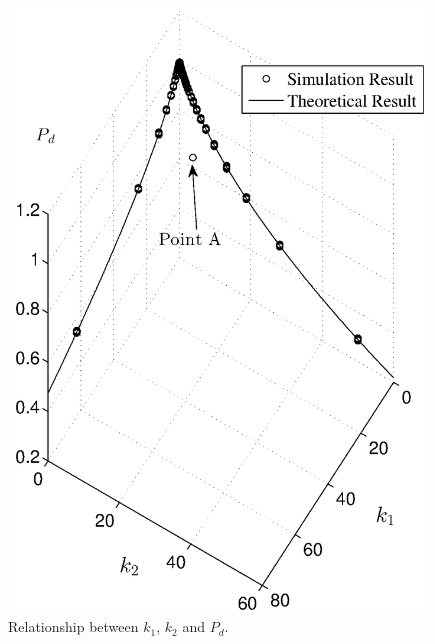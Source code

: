 \begin{figure}[!t]
  \centering 
  \includegraphics[width=12cm, height=16cm]{4/k1k2pd.eps}
  \caption{Relationship between $k_1$, $k_2$ and $P_d$.}
  \label{pic:15may10a1}
\end{figure}

